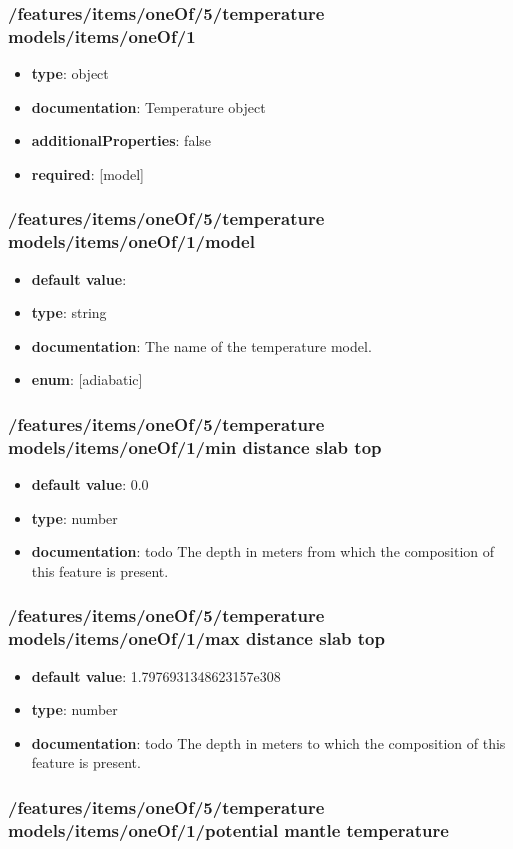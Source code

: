 \subsubsection{/features/items/oneOf/5/temperature models/items/oneOf/1}
\begin{itemize}\item {\bf type}: object
\item {\bf documentation}: Temperature object
\item {\bf additionalProperties}: false
\item {\bf required}: [model]\end{itemize}
\subsubsection{/features/items/oneOf/5/temperature models/items/oneOf/1/model}
\begin{itemize}\item {\bf default value}: 
\item {\bf type}: string
\item {\bf documentation}: The name of the temperature model.
\item {\bf enum}: [adiabatic]\end{itemize}\subsubsection{/features/items/oneOf/5/temperature models/items/oneOf/1/min distance slab top}
\begin{itemize}\item {\bf default value}: 0.0
\item {\bf type}: number
\item {\bf documentation}: todo The depth in meters from which the composition of this feature is present.
\end{itemize}\subsubsection{/features/items/oneOf/5/temperature models/items/oneOf/1/max distance slab top}
\begin{itemize}\item {\bf default value}: 1.7976931348623157e308
\item {\bf type}: number
\item {\bf documentation}: todo The depth in meters to which the composition of this feature is present.
\end{itemize}\subsubsection{/features/items/oneOf/5/temperature models/items/oneOf/1/potential mantle temperature}
